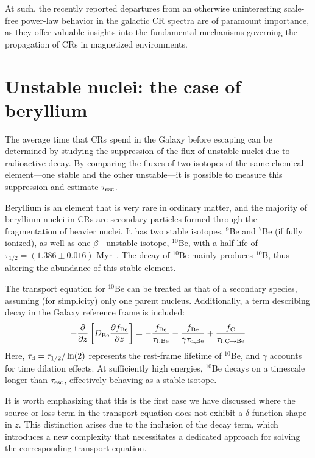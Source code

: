 At such, the recently reported departures from an otherwise uninteresting scale-free power-law behavior in the galactic CR spectra are of paramount importance, as they offer valuable insights into the fundamental mechanisms governing the propagation of CRs in magnetized environments.

\section{Unstable nuclei: the case of beryllium}
\label{sec:unstable}

The average time that CRs spend in the Galaxy before escaping can be determined by studying the suppression of the flux of unstable nuclei due to radioactive decay. By comparing the fluxes of two isotopes of the same chemical element—one stable and the other unstable—it is possible to measure this suppression and estimate $\tau_{\rm esc}$.

Beryllium is an element that is very rare in ordinary matter, and the majority of beryllium nuclei in CRs are secondary particles formed through the fragmentation of heavier nuclei. 
%
It has two stable isotopes, $^9$Be and $^7$Be (if fully ionized), as well as one $\beta^-$ unstable isotope, $^{10}$Be, with a half-life of $\tau_{1/2} = (1.386 \pm 0.016)$ Myr~\cite{Chmeleff2010nimb}. 
%
The decay of $^{10}$Be mainly produces $^{10}$B, thus altering the abundance of this stable element.

The transport equation for $^{10}$Be can be treated as that of a secondary species, assuming (for simplicity) only one parent nucleus. 
%
Additionally, a term describing decay in the Galaxy reference frame is included:
%
\begin{equation}
-\frac{\partial}{\partial z} \left[ D_{\rm Be} \frac{\partial f_{\rm Be}}{\partial z} \right] =
- \frac{f_{\rm Be}}{\tau_{\rm f, Be}} 
- \frac{f_{\rm Be}}{\gamma \tau_{\rm d, Be}} 
+ \frac{f_{\rm C}}{\tau_{\rm f, C \rightarrow Be}} 
\end{equation}
%
Here, $\tau_{\rm d} = \tau_{1/2} / \ln(2)$ represents the rest-frame lifetime of $^{10}$Be, and $\gamma$ accounts for time dilation effects.
%
At sufficiently high energies, $^{10}$Be decays on a timescale longer than $\tau_{\rm esc}$, effectively behaving as a stable isotope.

It is worth emphasizing that this is the first case we have discussed where the source or loss term in the transport equation does not exhibit a $\delta$-function shape in $z$. This distinction arises due to the inclusion of the decay term, which introduces a new complexity that necessitates a dedicated approach for solving the corresponding transport equation.

